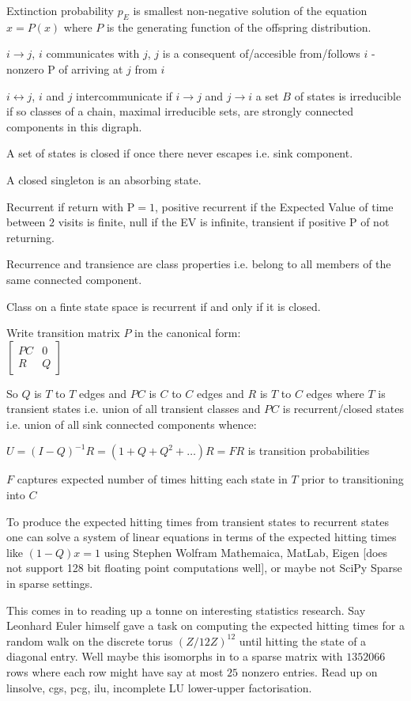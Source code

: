 Extinction probability $p_E$ is smallest non-negative solution of the equation $x=P(x)$ where $P$ is the generating function of the offspring distribution.

$i \rightarrow j$, $i$ communicates with $j$, $j$ is a consequent of/accesible from/follows $i$ - nonzero $\text{P}$ of arriving at $j$ from $i$

$i \leftrightarrow j$, $i$ and $j$ intercommunicate if $i \rightarrow j$ and $j \rightarrow i$ a set $B$ of states is irreducible if so classes of a chain, maximal irreducible sets, are strongly connected components in this digraph.

A set of states is closed if once there never escapes i.e. sink component.

A closed singleton is an absorbing state.

Recurrent if return with $\text{P}=1$, positive recurrent if the Expected Value of time between $2$ visits is finite, null if the EV is infinite, transient if positive $\text{P}$ of not returning.

Recurrence and transience are class properties i.e. belong to all members of the same connected component.

Class on a finte state space is recurrent if and only if it is closed.

Write transition matrix $P$ in the canonical form: \\
$\begin{bmatrix}
PC & 0 \\
R & Q
\end{bmatrix}$

So $Q$ is $T$ to $T$ edges and $PC$ is $C$ to $C$ edges and $R$ is $T$ to $C$ edges where $T$ is transient states i.e. union of all transient classes and $PC$ is recurrent/closed states i.e. union of all sink connected components whence:

$U=(I-Q)^{-1}R=(1+Q+Q^2+\dots)R=FR$ is transition probabilities

$F$ captures expected number of times hitting each state in $T$ prior to transitioning into $C$

To produce the expected hitting times from transient states to recurrent states one can solve a system of linear equations in terms of the expected hitting times like $(1-Q)x=1$ using Stephen Wolfram Mathemaica, MatLab, Eigen [does not support 128 bit floating point computations well], or maybe not SciPy Sparse in sparse settings.

This comes in to reading up a tonne on interesting statistics research. Say Leonhard Euler himself gave a task on computing the expected hitting times for a random walk on the discrete torus $(Z/12Z)^12$ until hitting the state of a diagonal entry. Well maybe this isomorphs in to a sparse matrix with $1352066$ rows where each row might have say at most $25$ nonzero entries. Read up on linsolve, cgs, pcg, ilu, incomplete LU lower-upper factorisation.


